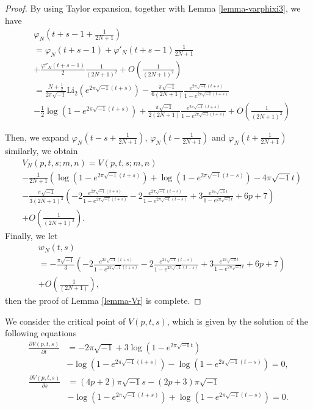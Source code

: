 \documentclass[12pt]{amsart}
\begin{document}
\begin{proof}
By using Taylor expansion, together with Lemma \ref{lemma-varphixi3}, we have 
\begin{align}
    &\varphi_N\left(t+s-1+\frac{1}{2N+1}\right)\\\nonumber
    &=\varphi_N(t+s-1)+\varphi'_N(t+s-1)\frac{1}{2N+1}\\\nonumber&+\frac{\varphi''_{N}(t+s-1)}{2}\frac{1}{(2N+1)^2}+O\left(\frac{1}{(2N+1)^2}\right)\\\nonumber
    &=\frac{N+\frac{1}{2}}{2\pi\sqrt{-1}}\text{Li}_2(e^{2\pi\sqrt{-1}(t+s)})-\frac{\pi\sqrt{-1}}{6(2N+1)}\frac{e^{2\pi\sqrt{-1}(t+s)}}{1-e^{2\pi\sqrt{-1}(t+s)}}\\\nonumber
    &-\frac{1}{2}\log(1-e^{2\pi\sqrt{-1}(t+s)})+\frac{\pi\sqrt{-1}}{2(2N+1)}\frac{e^{2\pi\sqrt{-1}(t+s)}}{1-e^{2\pi\sqrt{-1}(t+s)}}+O\left(\frac{1}{(2N+1)^2}\right)
    \end{align}

Then, we expand $\varphi_N\left(t-s+\frac{1}{2N+1}\right)$, $\varphi_N\left(t-\frac{1}{2N+1}\right)$ and $\varphi_N\left(t+\frac{1}{2N+1}\right)$ similarly,  we obtain 
\begin{align}
   &V_N(p,t,s;m,n)=V(p,t,s;m,n)\\\nonumber
   &-\frac{1}{2N+1}\left(\log(1-e^{2\pi\sqrt{-1}(t+s)})+\log(1-e^{2\pi\sqrt{-1}(t-s)})-4\pi\sqrt{-1}t\right)\\\nonumber
   &-\frac{\pi\sqrt{-1}}{3(2N+1)^2}\left(-2\frac{e^{2\pi\sqrt{-1}(t+s)}}{1-e^{2\pi\sqrt{-1}(t+s)}}-2\frac{e^{2\pi\sqrt{-1}(t-s)}}{1-e^{2\pi\sqrt{-1}(t-s)}}+3\frac{e^{2\pi\sqrt{-1}t}}{1-e^{2\pi\sqrt{-1}t}}+6p+7\right)\\\nonumber
   &+O\left(\frac{1}{(2N+1)^3}\right). 
\end{align}
Finally, we let 
\begin{align}
    &w_N(t,s)\\\nonumber
    &=-\frac{\pi\sqrt{-1}}{3}\left(-2\frac{e^{2\pi\sqrt{-1}(t+s)}}{1-e^{2\pi\sqrt{-1}(t+s)}}-2\frac{e^{2\pi\sqrt{-1}(t-s)}}{1-e^{2\pi\sqrt{-1}(t-s)}}+3\frac{e^{2\pi\sqrt{-1}t}}{1-e^{2\pi\sqrt{-1}t}}+6p+7\right)\\\nonumber
    &+O\left(\frac{1}{(2N+1)}\right),
\end{align}
then the proof of Lemma \ref{lemma-Vr} is complete. 
\end{proof}
We consider the critical point of $V(p,t,s)$, which is given by the solution of the following equations
\begin{align}  \label{equation-critical1}
    \frac{\partial V(p,t,s)}{\partial t}&=-2\pi\sqrt{-1}+3\log(1-e^{2\pi\sqrt{-1}t})\\\nonumber
    &-\log(1-e^{2\pi\sqrt{-1}(t+s)})-\log(1-e^{2\pi\sqrt{-1}(t-s)})=0,
\end{align}
\begin{align} \label{equation-critical2}
    \frac{\partial V(p,t,s)}{\partial s}&=(4p+2)\pi\sqrt{-1}s-(2p+3)\pi\sqrt{-1}\\\nonumber
    &-\log(1-e^{2\pi\sqrt{-1}(t+s)})+\log(1-e^{2\pi\sqrt{-1}(t-s)})=0. 
\end{align}
\end{document}
